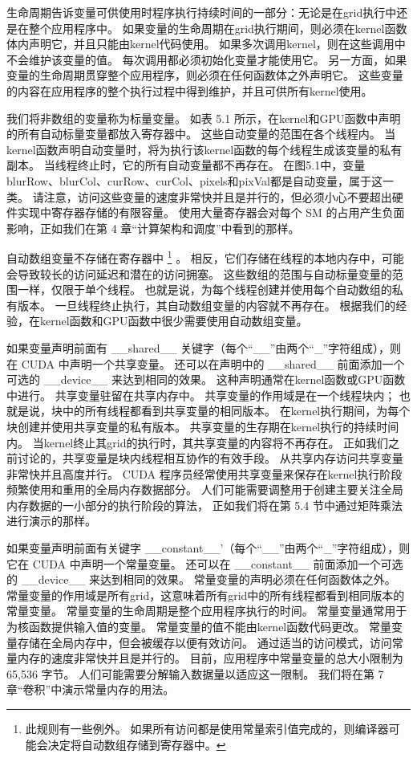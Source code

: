 生命周期告诉变量可供使用时程序执行持续时间的一部分：无论是在grid执行中还是在整个应用程序中。 
如果变量的生命周期在grid执行期间，则必须在kernel函数体内声明它，并且只能由kernel代码使用。 
如果多次调用kernel，则在这些调用中不会维护该变量的值。 每次调用都必须初始化变量才能使用它。 
另一方面，如果变量的生命周期贯穿整个应用程序，则必须在任何函数体之外声明它。 
这些变量的内容在应用程序的整个执行过程中得到维护，并且可供所有kernel使用。

我们将非数组的变量称为标量变量。 如表 5.1 所示，在kernel和GPU函数中声明的所有自动标量变量都放入寄存器中。 
这些自动变量的范围在各个线程内。 当kernel函数声明自动变量时，将为执行该kernel函数的每个线程生成该变量的私有副本。 
当线程终止时，它的所有自动变量都不再存在。 
在图5.1中，变量blurRow、blurCol、curRow、curCol、pixels和pixVal都是自动变量，属于这一类。 
请注意，访问这些变量的速度非常快并且是并行的，但必须小心不要超出硬件实现中寄存器存储的有限容量。 
使用大量寄存器会对每个 SM 的占用产生负面影响，正如我们在第 4 章“计算架构和调度”中看到的那样。

自动数组变量不存储在寄存器中
\footnote{此规则有一些例外。 如果所有访问都是使用常量索引值完成的，则编译器可能会决定将自动数组存储到寄存器中。} 。
相反，它们存储在线程的本地内存中，可能会导致较长的访问延迟和潜在的访问拥塞。 
这些数组的范围与自动标量变量的范围一样，仅限于单个线程。 也就是说，为每个线程创建并使用每个自动数组的私有版本。 
一旦线程终止执行，其自动数组变量的内容就不再存在。 根据我们的经验，在kernel函数和GPU函数中很少需要使用自动数组变量。

如果变量声明前面有 \_\_shared\_\_ 关键字（每个“\_\_”由两个“\_”字符组成），则在 CUDA 中声明一个共享变量。 
还可以在声明中的 \_\_shared\_\_ 前面添加一个可选的 \_\_device\_\_ 来达到相同的效果。 
这种声明通常在kernel函数或GPU函数中进行。 共享变量驻留在共享内存中。 共享变量的作用域是在一个线程块内； 
也就是说，块中的所有线程都看到共享变量的相同版本。 在kernel执行期间，为每个块创建并使用共享变量的私有版本。 
共享变量的生存期在kernel执行的持续时间内。 当kernel终止其grid的执行时，其共享变量的内容将不再存在。 
正如我们之前讨论的，共享变量是块内线程相互协作的有效手段。 从共享内存访问共享变量非常快并且高度并行。 
CUDA 程序员经常使用共享变量来保存在kernel执行阶段频繁使用和重用的全局内存数据部分。 
人们可能需要调整用于创建主要关注全局内存数据的一小部分的执行阶段的算法，
正如我们将在第 5.4 节中通过矩阵乘法进行演示的那样。

如果变量声明前面有关键字 \_\_constant\_\_'（每个“\_\_”由两个“\_”字符组成），则它在 CUDA 中声明一个常量变量。 
还可以在 \_\_constant\_\_ 前面添加一个可选的 \_\_device\_\_ 来达到相同的效果。 常量变量的声明必须在任何函数体之外。 
常量变量的作用域是所有grid，这意味着所有grid中的所有线程都看到相同版本的常量变量。 
常量变量的生命周期是整个应用程序执行的时间。 常量变量通常用于为核函数提供输入值的变量。 
常量变量的值不能由kernel函数代码更改。 常量变量存储在全局内存中，但会被缓存以便有效访问。 
通过适当的访问模式，访问常量内存的速度非常快并且是并行的。 目前，应用程序中常量变量的总大小限制为 65,536 字节。 
人们可能需要分解输入数据量以适应这一限制。 我们将在第 7 章“卷积”中演示常量内存的用法。

